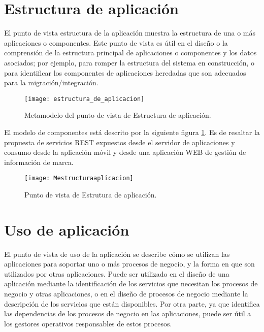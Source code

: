 \section{Estructura de aplicación}
El punto de vista estructura de la aplicación muestra la estructura de una o más aplicaciones o componentes. Este punto de vista es útil en el diseño o la comprensión de la estructura principal de aplicaciones o componentes y los datos asociados; por ejemplo, para romper la estructura del sistema en construcción, o para identificar los componentes de aplicaciones heredadas que son adecuados para la migración/integración.

\begin{figure}[H]
\centering
\texttt{[image: estructura\_de\_aplicacion]}
\caption{Metamodelo del punto de vista de Estructura de aplicación.}
\end{figure}

El modelo de componentes está descrito por la siguiente figura \ref{Mestructuraaplicacion}. Es de resaltar la propuesta de servicios REST expuestos desde el servidor de aplicaciones y consumo desde la aplicación móvil y desde una aplicación WEB de gestión de información de marca.

\begin{figure}[H]
\centering
\texttt{[image: Mestructuraaplicacion]}
\caption{Punto de vista de Estrutura de aplicación.}
\label{Mestructuraaplicacion}
\end{figure}


\section{Uso de aplicación}


El punto de vista de uso de la aplicación se describe cómo se utilizan las aplicaciones para soportar uno o más procesos de negocio, y la forma en que son utilizados por otras aplicaciones. Puede ser utilizado en el diseño de una aplicación mediante la identificación de los servicios que necesitan los procesos de negocio y otras aplicaciones, o en el diseño de procesos de negocio mediante la descripción de los servicios que están disponibles. Por otra parte, ya que identifica las dependencias de los procesos de negocio en las aplicaciones, puede ser útil a los gestores operativos responsables de estos procesos.

